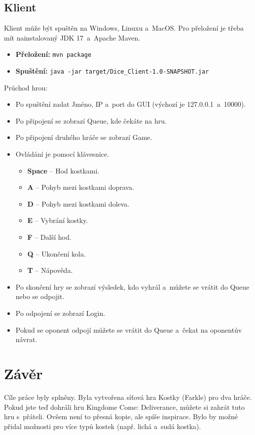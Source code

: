 \documentclass[12pt, a4paper]{article}
\begin{document}
\subsection{Klient}
Klient může být spuštěn na Windows, Linuxu a~MacOS.
Pro přeložení je třeba mít nainstalovaný JDK 17~a~Apache Maven.
\begin{itemize}[itemsep=-4pt]
    \item \textbf{Přeložení:} \texttt{mvn package}
    \item \textbf{Spuštění:} \texttt{java -jar target/Dice\_Client-1.0-SNAPSHOT.jar}
\end{itemize}

Průchod hrou:
\begin{itemize}
    \item Po spuštění zadat Jméno, IP a~port do GUI (výchozí je 127.0.0.1~a~10000).
    \item Po připojení se zobrazí Queue, kde čekáte na hru.
    \item Po připojení druhého hráče se zobrazí Game.
    \item Ovládání je pomocí klávesnice.
    \begin{itemize}[itemsep=-4pt]
        \item \textbf{Space} -- Hod kostkami.
        \item \textbf{A} -- Pohyb mezi kostkami doprava.
        \item \textbf{D} -- Pohyb mezi kostkami doleva.
        \item \textbf{E} -- Vybrání kostky.
        \item \textbf{F} -- Další hod.
        \item \textbf{Q} -- Ukončení kola.
        \item \textbf{T} -- Nápověda. 
    \end{itemize}
    \item Po skončení hry se zobrazí výsledek, kdo vyhrál a~můžete se vrátit do Queue nebo se odpojit.
    \item Po odpojení se zobrazí Login.
    \item Pokud se oponent odpojí můžete se vrátit do Queue a~čekat na oponentův návrat.
\end{itemize}

\newpage
\section{Závěr}
Cíle práce byly splněny.
Byla vytvořena síťová hra Kostky (Farkle) pro dva hráče.
Pokud jste teď dohráli hru Kingdome Come: Deliverance, můžete si zahrát tuto hru s~přáteli.
Ovšem není to přesná kopie, ale spíše inspirace.
Bylo by možné přidal možnosti pro více typů kostek (např. lichá a~sudá kostka).
\end{document}
